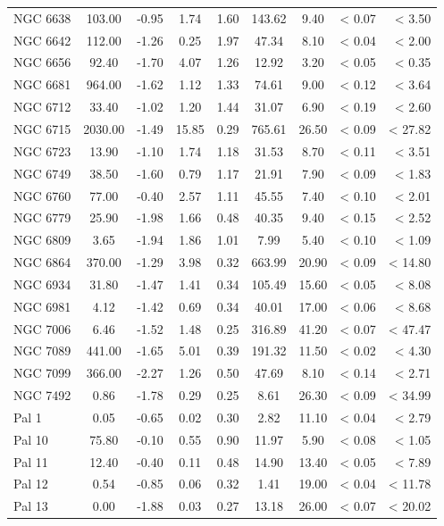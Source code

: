 \documentclass[doublespace,draft,nopageskip]{VTthesis} %
\begin{document}
\begin{appendices}
\begin{table}
\begin{tabular}{lcccccccr}
NGC 6638 & 103.00 & -0.95 & 1.74 & 1.60 & 143.62 & 9.40 & < 0.07 & < 3.50\\
NGC 6642 & 112.00 & -1.26 & 0.25 & 1.97 & 47.34 & 8.10 & < 0.04 & < 2.00\\
NGC 6656 & 92.40 & -1.70 & 4.07 & 1.26 & 12.92 & 3.20 & < 0.05 & < 0.35\\
NGC 6681 & 964.00 & -1.62 & 1.12 & 1.33 & 74.61 & 9.00 & < 0.12 & < 3.64\\
NGC 6712 & 33.40 & -1.02 & 1.20 & 1.44 & 31.07 & 6.90 & < 0.19 & < 2.60\\
NGC 6715 & 2030.00 & -1.49 & 15.85 & 0.29 & 765.61 & 26.50 & < 0.09 & < 27.82\\
NGC 6723 & 13.90 & -1.10 & 1.74 & 1.18 & 31.53 & 8.70 & < 0.11 & < 3.51\\
NGC 6749 & 38.50 & -1.60 & 0.79 & 1.17 & 21.91 & 7.90 & < 0.09 & < 1.83\\
NGC 6760 & 77.00 & -0.40 & 2.57 & 1.11 & 45.55 & 7.40 & < 0.10 & < 2.01\\
NGC 6779 & 25.90 & -1.98 & 1.66 & 0.48 & 40.35 & 9.40 & < 0.15 & < 2.52\\
NGC 6809 & 3.65 & -1.94 & 1.86 & 1.01 & 7.99 & 5.40 & < 0.10 & < 1.09\\
NGC 6864 & 370.00 & -1.29 & 3.98 & 0.32 & 663.99 & 20.90 & < 0.09 & < 14.80\\
NGC 6934 & 31.80 & -1.47 & 1.41 & 0.34 & 105.49 & 15.60 & < 0.05 & < 8.08\\
NGC 6981 & 4.12 & -1.42 & 0.69 & 0.34 & 40.01 & 17.00 & < 0.06 & < 8.68\\
NGC 7006 & 6.46 & -1.52 & 1.48 & 0.25 & 316.89 & 41.20 & < 0.07 & < 47.47\\
NGC 7089 & 441.00 & -1.65 & 5.01 & 0.39 & 191.32 & 11.50 & < 0.02 & < 4.30\\
NGC 7099 & 366.00 & -2.27 & 1.26 & 0.50 & 47.69 & 8.10 & < 0.14 & < 2.71\\
NGC 7492 & 0.86 & -1.78 & 0.29 & 0.25 & 8.61 & 26.30 & < 0.09 & < 34.99\\
Pal 1 & 0.05 & -0.65 & 0.02 & 0.30 & 2.82 & 11.10 & < 0.04 & < 2.79\\
Pal 10 & 75.80 & -0.10 & 0.55 & 0.90 & 11.97 & 5.90 & < 0.08 & < 1.05\\
Pal 11 & 12.40 & -0.40 & 0.11 & 0.48 & 14.90 & 13.40 & < 0.05 & < 7.89\\
Pal 12 & 0.54 & -0.85 & 0.06 & 0.32 & 1.41 & 19.00 & < 0.04 & < 11.78\\
Pal 13 & 0.00 & -1.88 & 0.03 & 0.27 & 13.18 & 26.00 & < 0.07 & < 20.02\\

\end{tabular}
\end{table}
\end{appendices}
\end{document}
